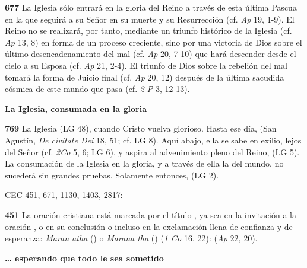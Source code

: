 \textbf{677} La Iglesia sólo entrará en la gloria del Reino a través de esta última Pascua en la que seguirá a su Señor en su muerte y su Resurrección (cf. \emph{Ap} 19, 1-9). El Reino no se realizará, por tanto, mediante un triunfo histórico de la Iglesia (cf. \emph{Ap} 13, 8) en forma de un proceso creciente, sino por una victoria de Dios sobre el último desencadenamiento del mal (cf. \emph{Ap} 20, 7-10) que hará descender desde el cielo a su Esposa (cf. \emph{Ap} 21, 2-4). El triunfo de Dios sobre la rebelión del mal tomará la forma de Juicio final (cf. \emph{Ap} 20, 12) después de la última sacudida cósmica de este mundo que pasa (cf. \emph{2 P} 3, 12-13).

\textbf{La Iglesia, consumada en la gloria}

\textbf{769} La Iglesia  (LG 48), cuando Cristo vuelva glorioso. Hasta ese día,  (San Agustín, \emph{De civitate Dei} 18, 51; cf. LG 8). Aquí abajo, ella se sabe en exilio, lejos del Señor (cf. \emph{2Co} 5, 6; LG 6), y aspira al advenimiento pleno del Reino,  (LG 5). La consumación de la Iglesia en la gloria, y a través de ella la del mundo, no sucederá sin grandes pruebas. Solamente entonces,  (LG 2).


CEC 451, 671, 1130, 1403, 2817:

\textbf{451} La oración cristiana está marcada por el título , ya sea en la invitación a la oración , o en su conclusión  o incluso en la exclamación llena de confianza y de esperanza: \emph{Maran atha} () o \emph{Marana tha} () (\emph{1 Co} 16, 22):  (\emph{Ap} 22, 20).



\textbf{\ldots{} esperando que todo le sea sometido}

